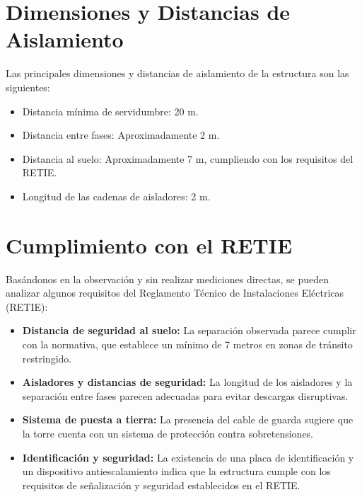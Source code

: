 \section{Dimensiones y Distancias de Aislamiento}

Las principales dimensiones y distancias de aislamiento de la estructura son las siguientes:

\begin{itemize}
    \item Distancia mínima de servidumbre: 20 m.
    \item Distancia entre fases: Aproximadamente 2 m.
    \item Distancia al suelo: Aproximadamente 7 m, cumpliendo con los requisitos del RETIE.
    \item Longitud de las cadenas de aisladores: 2 m.
\end{itemize}

\section{Cumplimiento con el RETIE}

Basándonos en la observación y sin realizar mediciones directas, se pueden analizar algunos requisitos del Reglamento Técnico de Instalaciones Eléctricas (RETIE):

\begin{itemize}
    \item \textbf{Distancia de seguridad al suelo:} La separación observada parece cumplir con la normativa, que establece un mínimo de 7 metros en zonas de tránsito restringido.
    \item \textbf{Aisladores y distancias de seguridad:} La longitud de los aisladores y la separación entre fases parecen adecuadas para evitar descargas disruptivas.
    \item \textbf{Sistema de puesta a tierra:} La presencia del cable de guarda sugiere que la torre cuenta con un sistema de protección contra sobretensiones.
    \item \textbf{Identificación y seguridad:} La existencia de una placa de identificación y un dispositivo antiescalamiento indica que la estructura cumple con los requisitos de señalización y seguridad establecidos en el RETIE.
\end{itemize}

